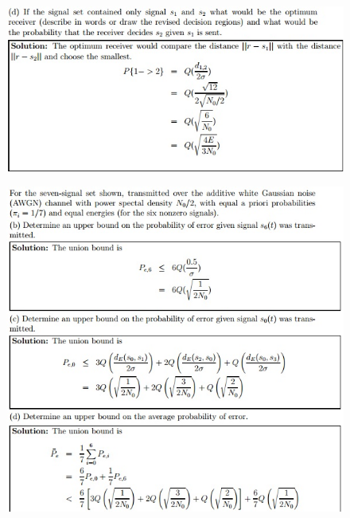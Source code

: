 \documentclass[11pt,landscape]{article}
\begin{document}
\begin{multicols}{3}
\begin{figure}[H]
    \includegraphics[scale=0.53]{./Images/3/Optreceiver.jpg}
\end{figure}
\begin{figure}[H]
    \includegraphics[scale=0.53]{./Images/3/unionbound.jpg}
\end{figure}



\end{multicols}
\end{document}
